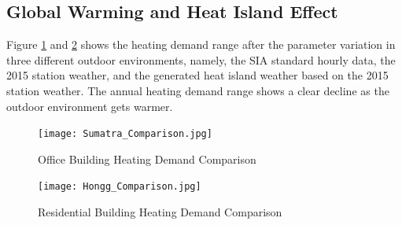         \subsection{Global Warming and Heat Island Effect}
		Figure \ref{fig:Sumatra_Comp} and \ref{fig:Hongg_Comp} shows the heating demand range after the parameter variation in three different outdoor environments, namely, the SIA standard hourly data, the 2015 station weather, and the generated heat island weather based on the 2015 station weather. The annual heating demand range shows a clear decline as the outdoor environment gets warmer.

	    \begin{figure}[H]
		\centering
		\texttt{[image: Sumatra\_Comparison.jpg]}
		\caption{Office Building Heating Demand Comparison}
		\label{fig:Sumatra_Comp}
		\end{figure}

	    \begin{figure}[H]
		\centering
		\texttt{[image: Hongg\_Comparison.jpg]}
		\caption{Residential Building Heating Demand Comparison}
		\label{fig:Hongg_Comp}
		\end{figure}
		